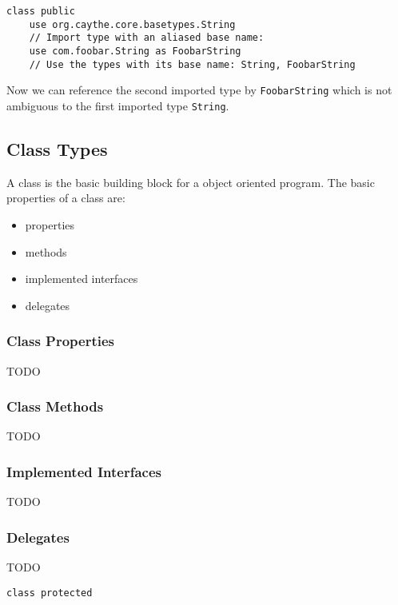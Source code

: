 \documentclass[11pt,a4paper]{report}
\begin{document}
\begin{lstlisting}[language=CayThe, title=foo/bar/Baz.ct]
    class public
    use org.caythe.core.basetypes.String
    // Import type with an aliased base name:
    use com.foobar.String as FoobarString
    // Use the types with its base name: String, FoobarString
\end{lstlisting}

Now we can reference the second imported type by \texttt{FoobarString} which is not ambiguous to the first imported type \texttt{String}.

\subsection{Class Types}

A class is the basic building block for a object oriented program. The basic properties of a class are:

\begin{itemize}
    \item properties
    \item methods
    \item implemented interfaces
    \item delegates
\end{itemize}

\subsubsection{Class Properties}

TODO

\subsubsection{Class Methods}

TODO

\subsubsection{Implemented Interfaces}

TODO

\subsubsection{Delegates}

TODO

\begin{lstlisting}[language=CayThe, title=foo/bar/Baz.ct]
    class protected
\end{lstlisting}
\end{document}
